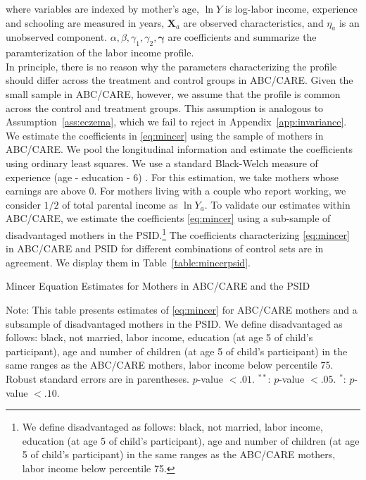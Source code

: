 \noindent where variables are indexed by mother's age, $\ln Y$ is log-labor income, experience and schooling are measured in years, $ \mathbf{X}_{a}$ are observed characteristics, and $\eta_{a}$ is an unobserved component. $\alpha, \beta, \gamma_{1}, \gamma_{2}, \bm{\gamma}$ are coefficients and summarize the paramterization of the labor income profile.\\

\noindent In principle, there is no reason why the parameters characterizing the profile should differ across the treatment and control groups in ABC/CARE. Given the small sample in ABC/CARE, however, we assume that the profile is common across the control and treatment groups. This assumption is analogous to Assumption~\ref{ass:eczema}, which we fail to reject in Appendix~\ref{app:invariance}.\\

\noindent We estimate the coefficients in \eqref{eq:mincer} using the sample of mothers in ABC/CARE. We pool the longitudinal information and estimate the coefficients using ordinary least squares. We use a standard Black-Welch measure of experience (age - education - 6) \citep{Smith_Welch_1979_IER}. For this estimation, we take mothers whose earnings are above $0$. For mothers living with a couple who report working, we consider $1/2$ of total parental income as $\ln Y_{a}$. To validate our estimates within ABC/CARE, we estimate the coefficients \eqref{eq:mincer} using a sub-sample of disadvantaged mothers in the PSID.\footnote{We define disadvantaged as follows: black, not married, labor income, education (at age 5 of child's participant), age and number of children (at age 5 of child's participant) in the same ranges as the ABC/CARE mothers, labor income below percentile 75.} The coefficients characterizing \eqref{eq:mincer} in ABC/CARE and PSID for different combinations of control sets are in agreement. We display them in Table~\ref{table:mincerpsid}.\\

\begin{table}[H] 
\begin{threeparttable}
\caption{Mincer Equation Estimates for Mothers in ABC/CARE and the PSID}
\label{table:mincerpsid}
\centering 
\footnotesize

\begin{tablenotes}
\footnotesize
\item Note: This table presents estimates of \eqref{eq:mincer} for ABC/CARE mothers and a subsample of disadvantaged mothers in the PSID. We define disadvantaged as follows: black, not married, labor income, education (at age 5 of child's participant), age and number of children (at age 5 of child's participant) in the same ranges as the ABC/CARE mothers, labor income below percentile 75. Robust standard errors are in parentheses. $p$-value $< .01$. $^{**}$: $p$-value $< .05$. $^{*}$: $p$-value $< .10$.
\end{tablenotes}
\end{threeparttable}
\end{table}

